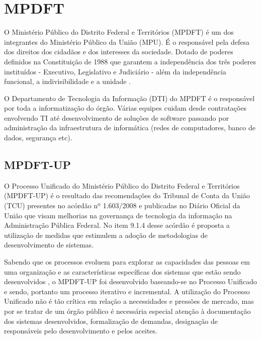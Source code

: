 \documentclass[
	article,			%
	11pt,				%
	oneside,			%
	a4paper,			%
	english,			%
	brazil,				%
	sumario=tradicional
	]{abntex2}
\begin{document}



\section{MPDFT}

\label{mpdft}

O Ministério Público do Distrito Federal e Territórios (MPDFT) é um dos
integrantes do Ministério Público da União (MPU). É o responsável pela defesa
dos direitos dos cidadãos e dos interesses da sociedade. Dotado de poderes
definidos na Constituição de 1988 que garantem a independência dos três poderes
instituídos - Executivo, Legislativo e Judiciário - além da independência
funcional, a indivisibilidade e a unidade \cite{mpdft}.

O Departamento de Tecnologia da Informação (DTI) do MPDFT é o responsável por
toda a informatização do órgão. Várias equipes cuidam desde contratações
envolvendo TI até desenvolvimento de soluções de software passando por
administração da infraestrutura de informática (redes de computadores, banco de
dados, segurança etc).

\subsection{MPDFT-UP}

O Processo Unificado do Ministério Público do Distrito Federal e Territórios
(MPDFT-UP) \cite{mpdft-up} é o resultado das recomendações do Tribunal de Conta
da União (TCU) presentes no acórdão nº 1.603/2008 \cite{acordao-tcu-1603-2008}
e publicadas no Diário Oficial da União \cite{dou-20080818} que visam melhorias
na governança de tecnologia da informação na Administração Pública Federal. No
item 9.1.4 desse acórdão é proposta a utilização de medidas que estimulem a
adoção de metodologias de desenvolvimento de sistemas.

Sabendo que os processos evoluem para explorar as capacidades das pessoas em uma
organização e as características específicas dos sistemas que estão sendo
desenvolvidos \cite{sommerville2007}, o MPDFT-UP foi desenvolvido baseando-se
no Processo Unificado e sendo, portanto um processo iterativo e incremental. A
utilização do Processo Unificado não é tão crítica em relação a necessidades e
pressões de mercado, mas por se tratar de um órgão público é necessária especial
atenção à documentação dos sistemas desenvolvidos, formalização de demandas,
designação de responsáveis pelo desenvolvimento e pelos aceites.
\end{document}
